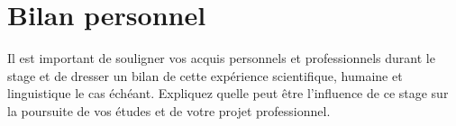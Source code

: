 \documentclass[twoside,11pt,openany,a4paper]{rapport}
\begin{document}
\chapter*{Bilan personnel}
Il est important de souligner vos acquis personnels et professionnels durant le stage et de  dresser un bilan de cette expérience scientifique, humaine et linguistique le cas échéant. Expliquez quelle peut être l’influence de ce stage sur la poursuite de vos études et de votre projet professionnel.




\backmatter
\end{document}
